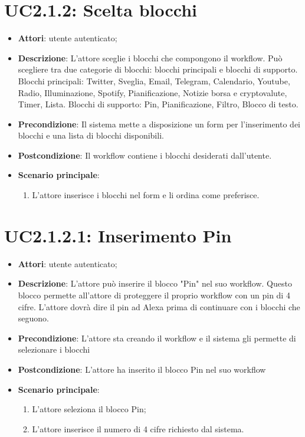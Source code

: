 \section{UC2.1.2: Scelta blocchi}
\label{UC2.1.2}
\begin{itemize}
	\item \textbf{Attori}: utente autenticato;
	\item \textbf{Descrizione}: L'attore sceglie i blocchi che compongono il workflow. Può scegliere tra due categorie di blocchi: blocchi principali e blocchi di supporto.
	Blocchi principali: Twitter, Sveglia, Email, Telegram, Calendario, Youtube, Radio, Illuminazione, Spotify, Pianificazione, Notizie borsa e cryptovalute, Timer, Lista.
	Blocchi di supporto: Pin, Pianificazione, Filtro, Blocco di testo.
	\item \textbf{Precondizione}: Il sistema mette a disposizione un form per l'inserimento dei blocchi e una lista di blocchi disponibili.
	\item \textbf{Postcondizione}: Il workflow contiene i blocchi desiderati dall'utente.
	\item \textbf{Scenario principale}:
	\begin{enumerate} \item L'attore inserisce i blocchi nel form e li ordina come preferisce.\end{enumerate}
\end{itemize}

\section{UC2.1.2.1: Inserimento Pin}
\label{UC2.1.2.1}
\begin{itemize}
	\item \textbf{Attori}: utente autenticato;
	\item \textbf{Descrizione}: L'attore può inserire il blocco "Pin" nel suo workflow. Questo blocco permette all'attore di proteggere il proprio workflow con un pin di 4 cifre. L'attore dovrà dire il pin ad Alexa prima di continuare con i blocchi che seguono.
	\item \textbf{Precondizione}: L'attore sta creando il workflow e il sistema gli permette di selezionare i blocchi
	\item \textbf{Postcondizione}: L'attore ha inserito il blocco Pin nel suo workflow
	\item \textbf{Scenario principale}:
	\begin{enumerate} \item L'attore seleziona il blocco Pin;  \item 
		L'attore inserisce il numero di 4 cifre richiesto dal sistema.\end{enumerate}
\end{itemize}

